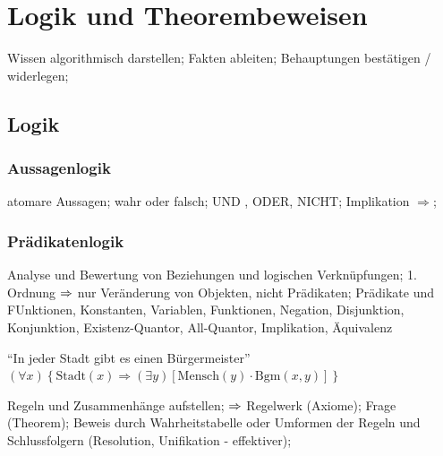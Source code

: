 \documentclass[german,color,6pt]{latex4ei/latex4ei_sheet}
\begin{document}
\section{Logik und Theorembeweisen}
\begin{sectionbox}
Wissen algorithmisch darstellen; Fakten ableiten; Behauptungen bestätigen / widerlegen;
\end{sectionbox}

\subsection{Logik}
\begin{sectionbox}
\subsubsection{Aussagenlogik}
atomare Aussagen; wahr oder falsch; UND , ODER, NICHT; Implikation $\Rightarrow$;
\end{sectionbox}

\begin{sectionbox}
\subsubsection{Prädikatenlogik}
Analyse und Bewertung von Beziehungen und logischen Verknüpfungen; 1. Ordnung $\Rightarrow$ nur Veränderung von Objekten, nicht Prädikaten; Prädikate und FUnktionen, Konstanten, Variablen, Funktionen, Negation, Disjunktion, Konjunktion, Existenz-Quantor, All-Quantor, Implikation, Äquivalenz

"`In jeder Stadt gibt es einen Bürgermeister"'
$(\forall x) \left\{ \text{Stadt}(x)  \Rightarrow (\exists y) \left[ \text{Mensch}(y) \cdot \text{Bgm}(x,y) \right] \right\}$

Regeln und Zusammenhänge aufstellen; $\Rightarrow$ Regelwerk (Axiome); Frage (Theorem); Beweis durch Wahrheitstabelle oder Umformen der Regeln und Schlussfolgern (Resolution, Unifikation - effektiver);
\end{sectionbox}
\end{document}
